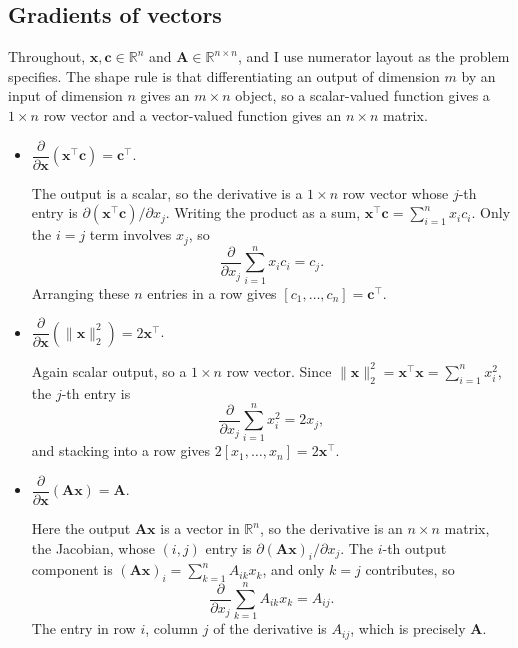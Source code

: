 \documentclass[11pt]{article}
\begin{document}
\subsection{Gradients of vectors}

Throughout, $\mathbf{x}, \mathbf{c} \in \mathbb{R}^n$ and $\mathbf{A} \in \mathbb{R}^{n \times n}$, and I
use numerator layout as the problem specifies. The shape rule is that differentiating an output of
dimension $m$ by an input of dimension $n$ gives an $m \times n$ object, so a scalar-valued function gives
a $1 \times n$ row vector and a vector-valued function gives an $n \times n$ matrix.

\begin{itemize}
  \item $\dfrac{\partial}{\partial \mathbf{x}}(\mathbf{x}^\top \mathbf{c}) = \mathbf{c}^\top$.

        The output is a scalar, so the derivative is a $1 \times n$ row vector whose $j$-th entry is
        $\partial(\mathbf{x}^\top\mathbf{c})/\partial x_j$. Writing the product as a sum,
        $\mathbf{x}^\top\mathbf{c} = \sum_{i=1}^{n} x_i c_i$. Only the $i = j$ term involves $x_j$, so
        \[
          \frac{\partial}{\partial x_j} \sum_{i=1}^{n} x_i c_i = c_j .
        \]
        Arranging these $n$ entries in a row gives
        $[c_1, \ldots, c_n] = \mathbf{c}^\top$.

  \item $\dfrac{\partial}{\partial \mathbf{x}}\left(\|\mathbf{x}\|_2^2\right) = 2\mathbf{x}^\top$.

        Again scalar output, so a $1 \times n$ row vector. Since
        $\|\mathbf{x}\|_2^2 = \mathbf{x}^\top\mathbf{x} = \sum_{i=1}^{n} x_i^2$, the $j$-th entry is
        \[
          \frac{\partial}{\partial x_j} \sum_{i=1}^{n} x_i^2 = 2x_j ,
        \]
        and stacking into a row gives $2[x_1, \ldots, x_n] = 2\mathbf{x}^\top$.

  \item $\dfrac{\partial}{\partial \mathbf{x}}(\mathbf{A}\mathbf{x}) = \mathbf{A}$.

        Here the output $\mathbf{A}\mathbf{x}$ is a vector in $\mathbb{R}^n$, so the derivative is an
        $n \times n$ matrix, the Jacobian, whose $(i,j)$ entry is $\partial(\mathbf{A}\mathbf{x})_i /
        \partial x_j$. The $i$-th output component is
        $(\mathbf{A}\mathbf{x})_i = \sum_{k=1}^{n} A_{ik} x_k$, and only $k = j$ contributes, so
        \[
          \frac{\partial}{\partial x_j} \sum_{k=1}^{n} A_{ik} x_k = A_{ij} .
        \]
        The entry in row $i$, column $j$ of the derivative is $A_{ij}$, which is precisely $\mathbf{A}$.


\end{itemize}
\end{document}

